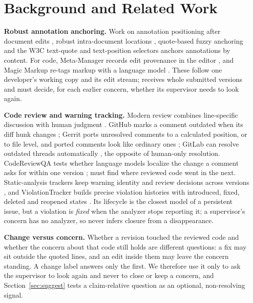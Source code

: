 \section{Background and Related Work}\label{sec:related}

\textbf{Robust annotation anchoring.} Work on annotation positioning after document edits \cite{brush2001robust}, robust intra-document locations \cite{phelps2000robust}, quote-based fuzzy anchoring \cite{csillag2013fuzzy} and the W3C text-quote and text-position selectors \cite{w3c2017annotation} anchors annotations by content. For code, Meta-Manager records edit provenance in the editor \cite{horvath2024metamanager}, and Magic Markup re-tags markup with a language model \cite{misback2024magic}. These follow one developer's working copy and its edit stream; \sys{} receives whole submitted versions and must decide, for each earlier concern, whether its supervisor needs to look again.

\textbf{Code review and warning tracking.} Modern review combines line-specific discussion with human judgment \cite{bacchelli2013expectations,sadowski2018modern}. GitHub marks a comment outdated when its diff hunk changes \cite{github2018outdating}; Gerrit ports unresolved comments to a calculated position, or to file level, and ported comments look like ordinary ones \cite{gerritporting}; GitLab can resolve outdated threads automatically \cite{gitlabautoresolve}, the opposite of human-only resolution. CodeReviewQA tests whether language models localize the change a comment asks for within one version \cite{lin2025codereviewqa}; \sys{} must find where reviewed code went in the next. Static-analysis trackers keep warning identity and review decisions across versions \cite{avgustinov2015tracking,li2024tracking,spacco2006tracking,sonarqube}, and ViolationTracker builds precise violation histories with introduced, fixed, deleted and reopened states \cite{yu2023violationtracker}. Its lifecycle is the closest model of a persistent issue, but a violation is \emph{fixed} when the analyzer stops reporting it; a supervisor's concern has no analyzer, so \sys{} never infers closure from a disappearance.

\textbf{Change versus concern.} Whether a revision touched the reviewed code and whether the concern about that code still holds are different questions: a fix may sit outside the quoted lines, and an edit inside them may leave the concern standing. A \sys{} change label answers only the first. We therefore use it only to ask the supervisor to look again and never to close or keep a concern, and Section~\ref{sec:suggest} tests a claim-relative question as an optional, non-resolving signal.

